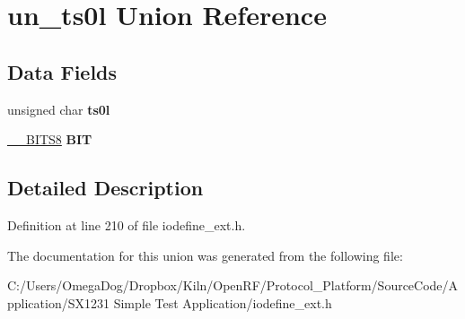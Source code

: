 \hypertarget{unionun__ts0l}{\section{un\-\_\-ts0l Union Reference}
\label{unionun__ts0l}
}
\subsection*{Data Fields}
\begin{DoxyCompactItemize}
\item 
\hypertarget{unionun__ts0l_a9de2665597a4dbe020e5e99c9f9a7b20}{unsigned char {\bfseries ts0l}}\label{unionun__ts0l_a9de2665597a4dbe020e5e99c9f9a7b20}

\item 
\hypertarget{unionun__ts0l_ac787a342fd8fc98cef35da9eeb438ee5}{\hyperlink{struct_____b_i_t_s8}{\-\_\-\-\_\-\-B\-I\-T\-S8} {\bfseries B\-I\-T}}\label{unionun__ts0l_ac787a342fd8fc98cef35da9eeb438ee5}

\end{DoxyCompactItemize}


\subsection{Detailed Description}


Definition at line 210 of file iodefine\-\_\-ext.\-h.



The documentation for this union was generated from the following file\-:\begin{DoxyCompactItemize}
\item 
C\-:/\-Users/\-Omega\-Dog/\-Dropbox/\-Kiln/\-Open\-R\-F/\-Protocol\-\_\-\-Platform/\-Source\-Code/\-Application/\-S\-X1231 Simple Test Application/iodefine\-\_\-ext.\-h\end{DoxyCompactItemize}
